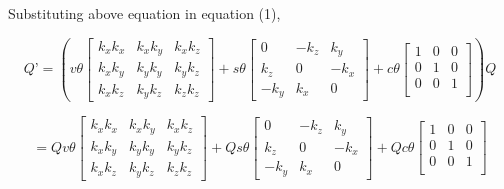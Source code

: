 \documentclass[a4paper]{article}
\begin{document}
\begin{qalist}
		Substituting above equation in equation (1), 
		
		\begin{equation} \textit{Q'}= \left(
				v\theta\left[ \begin{matrix} 
					\textit{${k}_{x}{k}_{x}$} & \textit{${k}_{x}{k}_{y}$} & \textit{${k}_{x}{k}_{z}$} \\
					\textit{${k}_{x}{k}_{y}$} & \textit{${k}_{y}{k}_{y}$} & \textit{${k}_{y}{k}_{z}$} \\
					\textit{${k}_{x}{k}_{z}$} & \textit{${k}_{y}{k}_{z}$} & \textit{${k}_{z}{k}_{z}$} 
				\end{matrix} \right]
				+
				s\theta\left[ \begin{matrix} 
					\textit{0} & \textit{$- {k}_{z}$} & \textit{${k}_{y}$} \\
					\textit{${k}_{z}$} & \textit{0} & \textit{$- {k}_{x}$} \\
					\textit{$- {k}_{y}$} & \textit{${k}_{x}$} & \textit{0}
				\end{matrix} \right]
				+
				c\theta\left[ \begin{matrix} 
					\textit{1} & \textit{0} & \textit{0} \\
					\textit{0} & \textit{1} & \textit{0} \\
					\textit{0} & \textit{0} & \textit{1} \\
				\end{matrix} \right] \right) \textit{Q}
		\end{equation}
		
		\begin{equation} = 
				Qv\theta\left[ \begin{matrix} 
					\textit{${k}_{x}{k}_{x}$} & \textit{${k}_{x}{k}_{y}$} & \textit{${k}_{x}{k}_{z}$} \\
					\textit{${k}_{x}{k}_{y}$} & \textit{${k}_{y}{k}_{y}$} & \textit{${k}_{y}{k}_{z}$} \\
					\textit{${k}_{x}{k}_{z}$} & \textit{${k}_{y}{k}_{z}$} & \textit{${k}_{z}{k}_{z}$} 
				\end{matrix} \right]
				+
				Qs\theta\left[ \begin{matrix} 
					\textit{0} & \textit{$- {k}_{z}$} & \textit{${k}_{y}$} \\
					\textit{${k}_{z}$} & \textit{0} & \textit{$- {k}_{x}$} \\
					\textit{$- {k}_{y}$} & \textit{${k}_{x}$} & \textit{0}
				\end{matrix} \right]
				+
				Qc\theta\left[ \begin{matrix} 
					\textit{1} & \textit{0} & \textit{0} \\
					\textit{0} & \textit{1} & \textit{0} \\
					\textit{0} & \textit{0} & \textit{1} \\
				\end{matrix} \right]  
		\end{equation}
		

\end{qalist}
\end{document}
